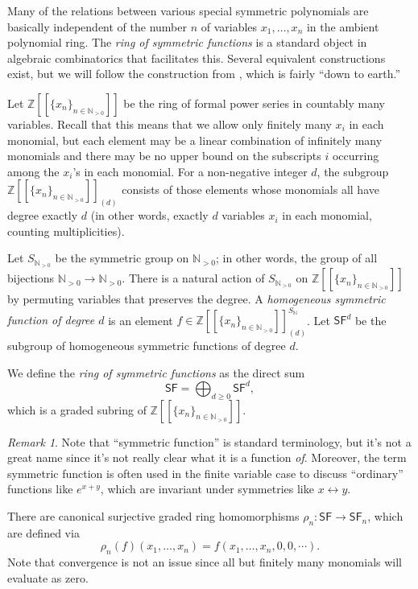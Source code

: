 \documentclass[12pt]{article}
\theoremstyle{plain}
\theoremstyle{definition}
\theoremstyle{remark}
\newtheorem{remark}[theorem]{Remark}
\numberwithin{equation}{section}
\begin{document}
Many of the relations between various special symmetric polynomials are
basically independent of the number $n$ of variables $x_1,\ldots,x_n$
in the ambient polynomial ring.  The \emph{ring of symmetric functions}
is a standard object in algebraic combinatorics that facilitates
this.  Several equivalent constructions exist, but we will follow
the construction from \cite{Stanley2}, which is fairly ``down to earth.''

Let $\mathbb{Z}[[\{x_n\}_{n \in \mathbb{N}_{>0}}]]$ be the ring of formal
power series in countably many variables.  Recall that this means that
we allow only finitely many $x_i$ in each monomial, but each element may be
a linear combination of infinitely many monomials and there may be no upper
bound on the subscripts $i$ occurring among the $x_i$'s in each
monomial.
For a non-negative integer $d$, the subgroup
$\mathbb{Z}[[\{x_n\}_{n \in \mathbb{N}_{>0}}]]_{(d)}$ consists of those
elements whose monomials all have degree exactly $d$ (in other words,
exactly $d$ variables $x_i$ in each monomial, counting multiplicities).

Let $S_{\mathbb{N}_{>0}}$ be the symmetric group on $\mathbb{N}_{>0}$; in other
words, the group of all bijections $\mathbb{N}_{>0} \to \mathbb{N}_{>0}$.
There is a natural action of $S_{\mathbb{N}_{>0}}$ on
$\mathbb{Z}[[\{x_n\}_{n \in \mathbb{N}_{>0}}]]$ by permuting variables that
preserves the degree.
A \emph{homogeneous symmetric function of degree $d$} is an element
$f \in \mathbb{Z}[[\{x_n\}_{n \in \mathbb{N}_{>0}}]]_{(d)}^{S_{\mathbb{N}}}$.
Let $\mathsf{SF}^d$ be the subgroup of
homogeneous symmetric functions of degree $d$.

We define the \emph{ring of symmetric functions} as the direct sum
\[
\mathsf{SF} = \bigoplus_{d \ge 0} \mathsf{SF}^d,
\]
which is a graded subring of $\mathbb{Z}[[\{x_n\}_{n \in \mathbb{N}_{>0}}]]$.

\begin{remark}
Note that ``symmetric function'' is standard terminology,
but it's not a great name since it's not
really clear what it is a function \emph{of}.
Moreover, the term symmetric function is often used in the finite
variable case to discuss ``ordinary'' functions like $e^{x+y}$,
which are invariant under symmetries like $x \leftrightarrow y$.
\end{remark}

There are canonical surjective graded ring homomorphisms
$\rho_n : \mathsf{SF} \to \mathsf{SF}_n$, which are defined via
\[
\rho_n(f)(x_1,\ldots,x_n) = f(x_1,\ldots,x_n,0,0,\cdots) .
\]
Note that convergence is not an issue since all but finitely many monomials
will evaluate as zero.
\end{document}
